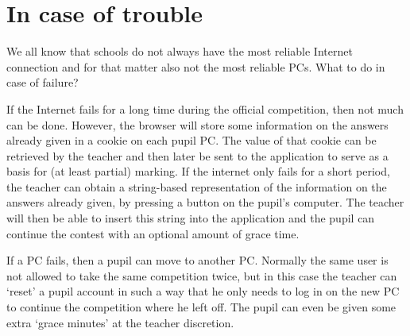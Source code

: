 \section{In case of trouble}

We all know that schools do not always have the most reliable Internet connection and for that matter also not the most reliable PCs. What to do in case of failure?

If the Internet fails for a long time during the official competition, then not much can be done. However, the browser will store some information on the answers already given in a cookie on each pupil PC. The value of that cookie can be retrieved by the teacher and then later be sent to the application to serve as a basis for (at least partial) marking. If the internet only fails for a short period, the teacher can obtain a string-based representation of the information on the answers already given, by pressing a button on the pupil's computer. The teacher will then be able to insert this string into the application and the pupil can continue the contest with an optional amount of grace time. 

If a PC fails, then a pupil can move to another PC. Normally the same user is not allowed to take the same competition twice, but in this case the teacher can `reset' a pupil account in such a way that he only needs to log in on the new PC to continue the competition where he left off. The pupil can even be given some extra `grace minutes' at the teacher discretion. 